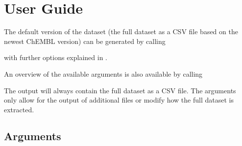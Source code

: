 \documentclass[letterpaper,10pt,english]{sphinxmanual}
\begin{document}
\sphinxstepscope


\chapter{User Guide}
\label{\detokenize{user_guide:user-guide}}\label{\detokenize{user_guide::doc}}
\sphinxAtStartPar
The default version of the dataset (the full dataset as a CSV file based on the newest ChEMBL version) can be generated by calling

\begin{sphinxVerbatim}[commandchars=\\\{\}]
   
\end{sphinxVerbatim}

\sphinxAtStartPar
with further options explained in {\hyperref[\detokenize{user_guide:arguments}]{}}.

\sphinxAtStartPar
An overview of the available arguments is also available by calling

\begin{sphinxVerbatim}[commandchars=\\\{\}]
  
\end{sphinxVerbatim}

\sphinxAtStartPar
The output will always contain the full dataset as a CSV file.
The arguments only allow for the output of additional files or modify how the full dataset is extracted.


\section{Arguments}
\label{\detokenize{user_guide:arguments}}
\end{document}
